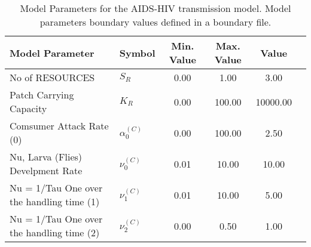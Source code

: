 \begin{table}
\centering
\begin{tabular}{p{5cm}lcccc}
{\bf Model Parameter} & {\bf Symbol} & {\bf Min. Value} & {\bf Max. Value} & {\bf Value}\\
\hline\hline
No of RESOURCES & $S_R$ & 0.00 & 1.00 & 3.00\\
Patch Carrying Capacity & $K_R$ & 0.00 & 100.00 & 10000.00\\
Comsumer Attack Rate (0) & $\alpha^{(C)}_0$ & 0.00 & 100.00 & 2.50\\
Nu, Larva (Flies) Develpment Rate & $\nu^{(C)}_0$ & 0.01 & 10.00 & 10.00\\
 Nu = 1/Tau	 One over the handling time (1) & $\nu^{(C)}_1$ & 0.01 & 10.00 & 5.00\\
 Nu = 1/Tau	 One over the handling time (2) & $\nu^{(C)}_2$ & 0.00 & 0.50 & 1.00\\
\hline\hline
\end{tabular}
\caption{Model Parameters for the AIDS-HIV transmission model. Model parameters boundary values defined in a boundary file.}
\end{table}
